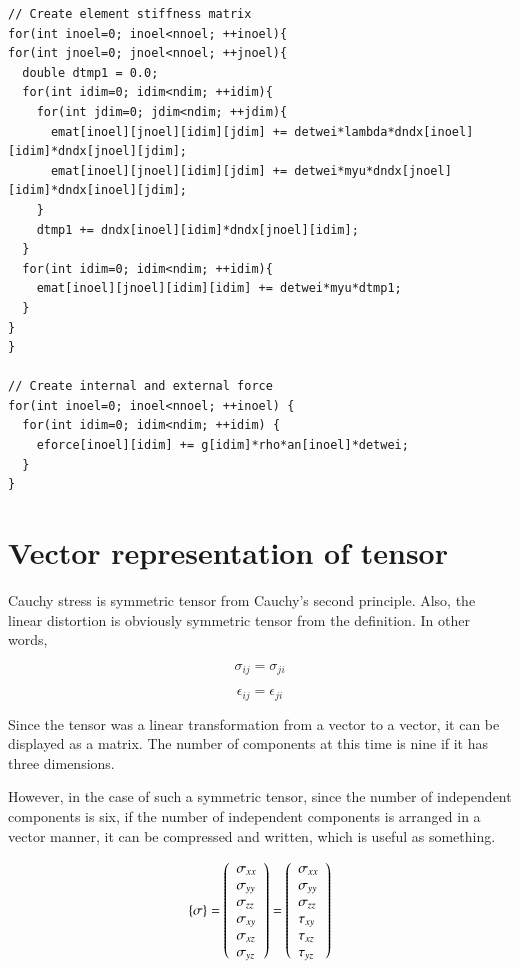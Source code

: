\begin{lstlisting}
// Create element stiffness matrix
for(int inoel=0; inoel<nnoel; ++inoel){
for(int jnoel=0; jnoel<nnoel; ++jnoel){
  double dtmp1 = 0.0;
  for(int idim=0; idim<ndim; ++idim){
    for(int jdim=0; jdim<ndim; ++jdim){
      emat[inoel][jnoel][idim][jdim] += detwei*lambda*dndx[inoel][idim]*dndx[jnoel][jdim]; 
      emat[inoel][jnoel][idim][jdim] += detwei*myu*dndx[jnoel][idim]*dndx[inoel][jdim];
    }
    dtmp1 += dndx[inoel][idim]*dndx[jnoel][idim];
  }
  for(int idim=0; idim<ndim; ++idim){
    emat[inoel][jnoel][idim][idim] += detwei*myu*dtmp1;
  }
}
}
 
// Create internal and external force
for(int inoel=0; inoel<nnoel; ++inoel) {
  for(int idim=0; idim<ndim; ++idim) {
    eforce[inoel][idim] += g[idim]*rho*an[inoel]*detwei;
  }
}
\end{lstlisting}

\section{Vector representation of tensor}


Cauchy stress is symmetric tensor from Cauchy's second principle. Also, the linear distortion is obviously symmetric tensor from the definition. In other words,

\begin{equation}
\sigma_{ij}=\sigma_{ji}
\end{equation}

\begin{equation}
\epsilon_{ij}=\epsilon_{ji}
\end{equation}


Since the tensor was a linear transformation from a vector to a vector, it can be displayed as a matrix. The number of components at this time is nine if it has three dimensions.

However, in the case of such a symmetric tensor, since the number of independent components is six, if the number of independent components is arranged in a vector manner, it can be compressed and written, which is useful as something.

\begin{equation}
\{\mathbf{\sigma}\}
=\left(\begin{array}{l}
\sigma_{xx}\\
\sigma_{yy}\\
\sigma_{zz}\\
\sigma_{xy}\\
\sigma_{xz}\\
\sigma_{yz}\end{array}\right)
=\left(\begin{array}{l}
\sigma_{xx}\\
\sigma_{yy}\\
\sigma_{zz}\\
\tau_{xy}\\
\tau_{xz}\\
\tau_{yz}
\end{array}\right)
\end{equation}

